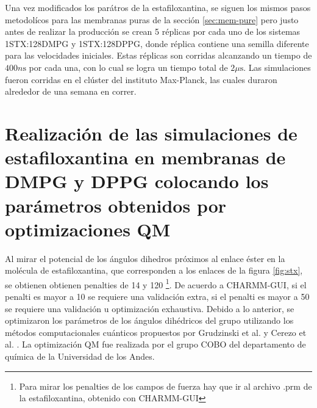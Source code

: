 Una vez modificados los par\'{a}tros de la estafiloxantina, se siguen los mismos pasos metodol\'{i}cos para las membranas puras de la secci\'{o}n \ref{sec:mem-pure} pero justo antes de realizar la producci\'{o}n se crean 5 r\'{e}plicas por cada uno de los sistemas 1STX:128DMPG y 1STX:128DPPG, donde r\'{e}plica contiene una semilla diferente para las velocidades iniciales. Estas r\'{e}plicas son corridas alcanzando un tiempo de $400n\mathrm{s}$ por cada una, con lo cual se logra un tiempo total de $2\mu\mathrm{s}$. Las simulaciones fueron corridas en el cl\'{u}ster del instituto Max-Planck, las cuales duraron alrededor de una semana en correr.



\section{Realizaci\'{o}n de las simulaciones de estafiloxantina en membranas de DMPG y DPPG colocando los par\'{a}metros obtenidos por optimizaciones QM}



Al mirar el potencial de los \'{a}ngulos dihedros pr\'{o}ximos al enlace \'{e}ster en la mol\'{e}cula de estafiloxantina, que corresponden a los enlaces  de la figura \ref{fig:stx}, se obtienen obtienen penalties de 14 y 120 \footnote{Para mirar los penalties de los campos de fuerza hay que ir al archivo .prm de la estafiloxantina, obtenido con CHARMM-GUI}. De acuerdo a CHARMM-GUI, si el penalti es mayor a 10 se requiere una validaci\'{o}n extra, si el penalti es mayor a 50 se requiere una validaci\'{o}n u optimizaci\'{o}n exhaustiva. Debido a lo anterior, se optimizaron los par\'{a}metros de los \'{a}ngulos dih\'{e}dricos del grupo  utilizando los m\'{e}todos computacionales cu\'{a}nticos propuestos por Grudzinski et al. \cite{Grudzinski2017LocalizationBilayer} y Cerezo et al. \cite{Cerezo2012AntioxidantSimulations}. La optimizaci\'{o}n QM fue realizada  por el grupo COBO del departamento de qu\'{i}mica de la Universidad de los Andes.\\

